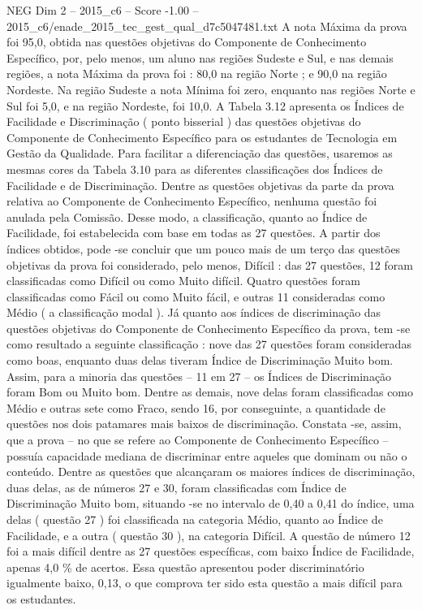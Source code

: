 \begin{textsample}{NEG Dim 2 – 2015\_c6 – Score -1.00 – 2015\_c6/enade\_2015\_tec\_gest\_qual\_d7c5047481.txt}
A nota Máxima da prova foi 95,0, obtida nas questões objetivas do Componente de Conhecimento Específico, por, pelo menos, um aluno nas regiões Sudeste e Sul, e nas demais regiões, a nota Máxima da prova foi : 80,0 na região Norte ; e 90,0 na região Nordeste.
Na região Sudeste a nota Mínima foi zero, enquanto nas regiões Norte e Sul foi 5,0, e na região Nordeste, foi 10,0.
A Tabela 3.12 apresenta os Índices de Facilidade e Discriminação ( ponto bisserial ) das questões objetivas do Componente de Conhecimento Específico para os estudantes de Tecnologia em Gestão da Qualidade.
Para facilitar a diferenciação das questões, usaremos as mesmas cores da Tabela 3.10 para as diferentes classificações dos Índices de Facilidade e de Discriminação.
Dentre as questões objetivas da parte da prova relativa ao Componente de Conhecimento Específico, nenhuma questão foi anulada pela Comissão.
Desse modo, a classificação, quanto ao Índice de Facilidade, foi estabelecida com base em todas as 27 questões.
A partir dos índices obtidos, pode -se concluir que um pouco mais de um terço das questões objetivas da prova foi considerado, pelo menos, Difícil : das 27 questões, 12 foram classificadas como Difícil ou como Muito difícil.
Quatro questões foram classificadas como Fácil ou como Muito fácil, e outras 11 consideradas como Médio ( a classificação modal ).
Já quanto aos índices de discriminação das questões objetivas do Componente de Conhecimento Específico da prova, tem -se como resultado a seguinte classificação : nove das 27 questões foram consideradas como boas, enquanto duas delas tiveram Índice de Discriminação Muito bom.
Assim, para a minoria das questões – 11 em 27 – os Índices de Discriminação foram Bom ou Muito bom.
Dentre as demais, nove delas foram classificadas como Médio e outras sete como Fraco, sendo 16, por conseguinte, a quantidade de questões nos dois patamares mais baixos de discriminação.
Constata -se, assim, que a prova – no que se refere ao Componente de Conhecimento Específico – possuía capacidade mediana de discriminar entre aqueles que dominam ou não o conteúdo.
Dentre as questões que alcançaram os maiores índices de discriminação, duas delas, as de números 27 e 30, foram classificadas com Índice de Discriminação Muito bom, situando -se no intervalo de 0,40 a 0,41 do índice, uma delas ( questão 27 ) foi classificada na categoria Médio, quanto ao Índice de Facilidade, e a outra ( questão 30 ), na categoria Difícil.
A questão de número 12 foi a mais difícil dentre as 27 questões específicas, com baixo Índice de Facilidade, apenas 4,0 \% de acertos.
Essa questão apresentou poder discriminatório igualmente baixo, 0,13, o que comprova ter sido esta questão a mais difícil para os estudantes.

\end{textsample}
